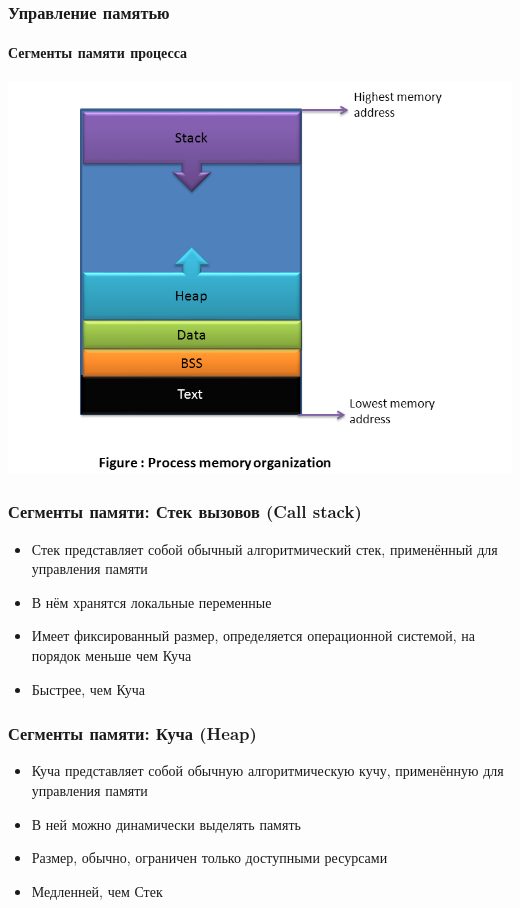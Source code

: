 \documentclass[12pt,pdf,hyperref={unicode}]{beamer}
\begin{document}
\begin{frame}[fragile]
\frametitle{Управление памятью} 
\framesubtitle{Сегменты памяти процесса}
\begin{center}
\includegraphics[width=0.9\linewidth]{images/process_memory_organization.png}
\end{center}
\end{frame}




\begin{frame}[fragile]
\frametitle{Сегменты памяти: Стек вызовов (Call stack)} 
\begin{itemize}
\item Стек представляет собой обычный алгоритмический стек, применённый для управления памяти
\item В нём хранятся локальные переменные
\item Имеет фиксированный размер, определяется операционной системой, на порядок меньше чем Куча
\item Быстрее, чем Куча
\end{itemize}
\end{frame}

\begin{frame}[fragile]
\frametitle{Сегменты памяти: Куча (Heap)} 
\begin{itemize}
\item Куча представляет собой обычную алгоритмическую кучу, применённую для управления памяти
\item В ней можно динамически выделять память
\item Размер, обычно, ограничен только доступными ресурсами
\item Медленней, чем Стек
\end{itemize}
\end{frame}
\end{document}
